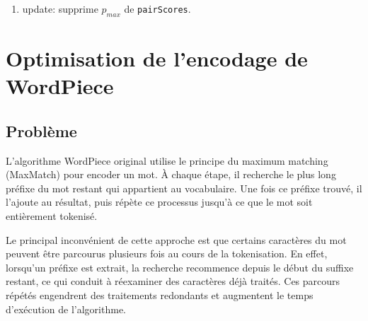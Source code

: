 \documentclass[12pt,a4paper]{report}
\begin{document}
\begin{enumerate}
\begin{enumerate}[label=\alph*)]
	 	La méthode \texttt{addNewPairScoresFrom:and:} reçoit deux instances de \texttt{Token}. Elle construit la paire de symboles à partir des valeurs contenues dans leurs attributs \texttt{token}. Si cette paire existe dans \texttt{pairFrequencies}, elle calcule son score à l'aide de sa fréquence dans \texttt{pairFrequencies} ainsi que des fréquences de chacun de ses deux symboles dans \texttt{tokenFrequencies}, puis ajoute cette paire dans \texttt{pairScores} en lui associant ce score.
	 	
	 	Grâce aux références contenues dans P, seules les nouvelles paires impliquant le symbole créé par la fusion sont examinées. Il n'est donc pas nécessaire de parcourir l'ensemble de la liste doublement chaînée pour mettre à jour \texttt{pairScores}.
	 	
	 	\item update: supprime  $p_{max}$ de \texttt{pairScores}.
	 	
	 \end{enumerate}
	
	\end{enumerate}
	

	
	
	
	
	
	
	
	
	
	\section{Optimisation de l'encodage de WordPiece}
	
	\subsection{Problème}
	
	L'algorithme WordPiece original utilise le principe du maximum matching (MaxMatch) pour encoder un mot. À chaque étape, il recherche le plus long préfixe du mot restant qui appartient au vocabulaire. Une fois ce préfixe trouvé, il l'ajoute au résultat, puis répète ce processus jusqu'à ce que le mot soit entièrement tokenisé.
	
	Le principal inconvénient de cette approche est que certains caractères du mot peuvent être parcourus plusieurs fois au cours de la tokenisation. En effet, lorsqu'un préfixe est extrait, la recherche recommence depuis le début du suffixe restant, ce qui conduit à réexaminer des caractères déjà traités. Ces parcours répétés engendrent des traitements redondants et augmentent le temps d'exécution de l'algorithme.
	
\end{document}
